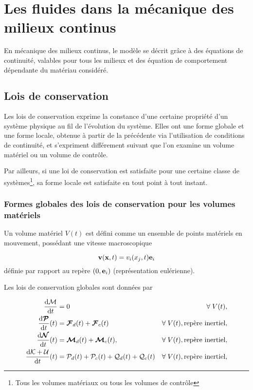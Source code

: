 
\chapter{Les fluides dans la mécanique des milieux continus}
  En mécanique des milieux continus, le modèle se décrit grâce à des équations de continuité, valables pour tous les milieux et des équation de comportement dépendante du matériau considéré.

  \section{Lois de conservation}
    Les lois de conservation exprime la constance d'une certaine propriété d'un système physique au fil de l'évolution du système. Elles ont une forme globale et une forme locale, obtenue à partir de la précédente via l'utilisation de conditions de continuité, et s'expriment différement suivant que l'on examine un volume matériel ou un volume de contrôle.

    Par ailleurs, si une loi de conservation est satisfaite pour une certaine classe de systèmes\footnote{Tous les volumes matériaux ou tous les volumes de contrôle}, sa forme locale est satisfaite en tout point à tout instant.

    \subsection{Formes globales des lois de conservation pour les volumes matériels}
      Un volume matériel $V(t)$ est défini comme un ensemble de points matériels en mouvement, possédant une vitesse macroscopique

      \begin{equation}
        \vb{v}(\vb{x}, t) = v_i(x_j, t)\vb{e}_i
      \end{equation}
      définie par rapport au repère $(0, \vb{e}_i)$ (représentation eulérienne).

      Les lois de conservation globales sont données par

      \begin{equation}\begin{aligned}
        \dv{\mathcal{M}}{t} &= 0 & \forall \; V(t),\\
        \dv{\boldsymbol{\mathcal{P}}}{t} {}(t) &= \boldsymbol{\mathcal{F}}_d(t) + \boldsymbol{\mathcal{F}}_c(t) & \forall \; V(t), \textrm{repère inertiel},\\
        \dv{\boldsymbol{\mathcal{N}}}{t} {}(t) &= \boldsymbol{\mathcal{M}}_d(t) + \boldsymbol{\mathcal{M}}_c(t), & \forall \; V(t), \textrm{repère inertiel}, \\
        \dv{\mathcal{K} + \mathcal{U}}{t} {}(t) &= \mathcal{P}_d(t) + \mathcal{P}_c(t) + \mathcal{Q}_d(t) + \mathcal{Q}_c(t) & \forall \; V(t), \textrm{repère inertiel},
      \end{aligned}\end{equation}

